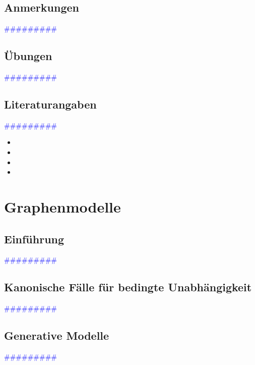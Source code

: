 \documentclass{article}
\begin{document}
  \subsection{Anmerkungen} %
      \textcolor{blue}{\#\#\#\#\#\#\#\#\#}
  \subsection{Übungen} %
      \textcolor{blue}{\#\#\#\#\#\#\#\#\#}
  \subsection{Literaturangaben} %
      \textcolor{blue}{\#\#\#\#\#\#\#\#\#}

      \begin{itemize}
      \color{red}
        \item
        \item
      \color{ForestGreen}
        \item
        \item
      \end{itemize}




\newpage
\section{Graphenmodelle} %
  \subsection{Einführung} %
      \textcolor{blue}{\#\#\#\#\#\#\#\#\#}
  \subsection{Kanonische Fälle für bedingte Unabhängigkeit} %
      \textcolor{blue}{\#\#\#\#\#\#\#\#\#}
  \subsection{Generative Modelle} %
      \textcolor{blue}{\#\#\#\#\#\#\#\#\#}
\end{document}
